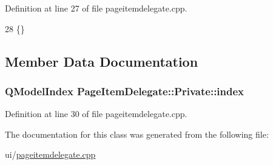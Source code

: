 Definition at line 27 of file pageitemdelegate.\+cpp.


\begin{DoxyCode}
28         \{\}
\end{DoxyCode}


\subsection{Member Data Documentation}
\hypertarget{classPageItemDelegate_1_1Private_a0183829c4130511959080e7e5c8fa188}{
\subsubsection[{index}]{\setlength{\rightskip}{0pt plus 5cm}Q\+Model\+Index Page\+Item\+Delegate\+::\+Private\+::index}}\label{classPageItemDelegate_1_1Private_a0183829c4130511959080e7e5c8fa188}


Definition at line 30 of file pageitemdelegate.\+cpp.



The documentation for this class was generated from the following file\+:\begin{DoxyCompactItemize}
\item 
ui/\hyperlink{pageitemdelegate_8cpp}{pageitemdelegate.\+cpp}\end{DoxyCompactItemize}
